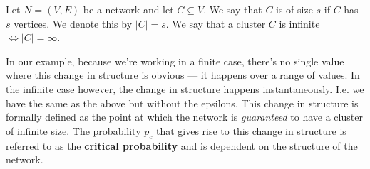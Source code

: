 \begin{definition}\label{def:cluster size}
  Let $N = (V, E)$ be a network and let $C \subseteq V$. We say that $C$ is of size $s$ if $C$ has $s$ vertices. We denote this by $|C| = s$. We say that a cluster $C$ is infinite
  $\iff |C| = \infty$.
\end{definition}

In our example, because we're working in a finite case, there's no single value where this change in structure is obvious --- it happens over a range of values. In the infinite
case however, the change in structure happens instantaneously. I.e. we have the same as the above but without the epsilons. This change in structure is formally defined as the
point at which the network is \textit{guaranteed} to have a cluster of infinite size. The probability $p_c$ that gives rise to this change in structure is referred to as the
\textbf{critical probability} and is dependent on the structure of the network.

